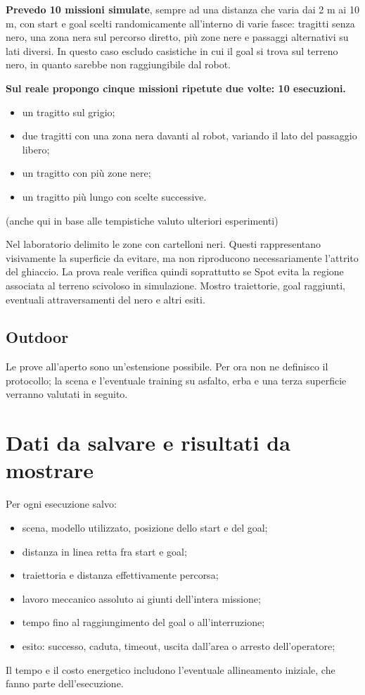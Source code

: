 \documentclass[11pt,a4paper]{article}
\begin{document}
\textbf{Prevedo 10 missioni simulate}, sempre ad una distanza che varia dai 2 m ai 10 m, con start e goal scelti randomicamente all'interno di varie fasce: tragitti senza nero, una zona nera sul percorso diretto, più zone nere e passaggi alternativi su lati diversi.
In questo caso escludo casistiche in cui il goal si trova sul terreno nero, in quanto sarebbe non raggiungibile dal robot.

\textbf{Sul reale propongo cinque missioni ripetute due volte: 10 esecuzioni.}
\begin{itemize}
\item un tragitto sul grigio;
\item due tragitti con una zona nera davanti al robot, variando il lato del passaggio libero;
\item un tragitto con più zone nere;
\item un tragitto più lungo con scelte successive.
\end{itemize}

(anche qui in base alle tempistiche valuto ulteriori esperimenti)

Nel laboratorio delimito le zone con cartelloni neri.
Questi rappresentano visivamente la superficie da evitare, ma non riproducono necessariamente l'attrito del ghiaccio. La prova reale verifica quindi soprattutto se Spot evita la regione associata al terreno scivoloso in simulazione. Mostro traiettorie, goal raggiunti, eventuali attraversamenti del nero e altri esiti.

\subsection{Outdoor}

Le prove all'aperto sono un'estensione possibile. Per ora non ne definisco il protocollo; la scena e l'eventuale training su asfalto, erba e una terza superficie verranno valutati in seguito.

\section{Dati da salvare e risultati da mostrare}

Per ogni esecuzione salvo:
\begin{itemize}
\item scena, modello utilizzato, posizione dello start e del goal;
\item distanza in linea retta fra start e goal;
\item traiettoria e distanza effettivamente percorsa;
\item lavoro meccanico assoluto ai giunti dell'intera missione;
\item tempo fino al raggiungimento del goal o all'interruzione;
\item esito: successo, caduta, timeout, uscita dall'area o arresto dell'operatore;
\end{itemize}

Il tempo e il costo energetico includono l'eventuale allineamento iniziale, che fanno parte dell'esecuzione.
\end{document}
